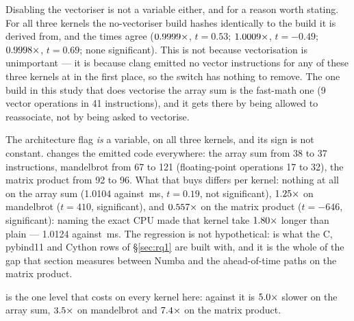 Disabling the vectoriser is not a variable either, and for a reason worth stating. For all three
kernels the no-vectoriser build hashes identically to the  build it is
derived from, and the times agree ($\meas{ratio:b1_flags-314:arraysum/O3native_novec|b1_flags-314:arraysum/O3native}{0.9999}\times$, $t=0.53$; $\meas{ratio:b1_flags-314:mandelbrot/O3native_novec|b1_flags-314:mandelbrot/O3native}{1.0009}\times$, $t=-0.49$;
$\meas{ratio:b1_flags-314:matmul/O3native_novec|b1_flags-314:matmul/O3native}{0.9998}\times$, $t=0.69$; none significant). This is not because vectorisation is unimportant
--- it is because clang emitted no vector instructions for any of these three kernels at
 in the first place, so the switch has nothing to remove. The one build
in this study that does vectorise the array sum is the fast-math one (9 vector operations in 41
instructions), and it gets there by being allowed to reassociate, not by being asked to
vectorise.

The architecture flag \emph{is} a variable, on all three kernels, and its sign is not constant.
 changes the emitted code everywhere: the array sum from 38 to 37
instructions, mandelbrot from 67 to 121 (floating-point operations 17 to 32), the matrix product
from 92 to 96. What that buys differs per kernel: nothing at all on the array sum
(1.0104 against \,ms, $t=0.19$, not significant), $\meas{ratio:b1_flags-314:mandelbrot/O2|b1_flags-314:mandelbrot/O3native}{1.25}\times$ on mandelbrot
($t=410$, significant), and $\meas{ratio:b1_flags-314:matmul/O2|b1_flags-314:matmul/O3native}{0.557}\times$ on the matrix product ($t=-646$, significant): naming
the exact CPU made that kernel take $\meas{ratio:b1_flags-314:matmul/O3native|b1_flags-314:matmul/O2}{1.80}\times$ longer than plain  --- 1.0124 against
\,ms. The
regression is not hypothetical:  is what the C, pybind11 and Cython
rows of \S\ref{sec:rq1} are built with, and it is the whole of the gap that section measures
between Numba and the ahead-of-time paths on the matrix product.

 is the one level that costs on every kernel here: against  it is
$\meas{ratio:b1_flags-314:arraysum/O0|b1_flags-314:arraysum/O2}{5.0}\times$ slower on the array sum, $\meas{ratio:b1_flags-314:mandelbrot/O0|b1_flags-314:mandelbrot/O2}{3.5}\times$ on mandelbrot and $\meas{ratio:b1_flags-314:matmul/O0|b1_flags-314:matmul/O2}{7.4}\times$ on the matrix
product.

